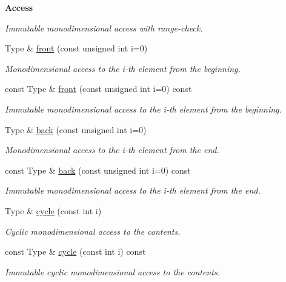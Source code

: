 \begin{Indent}{\bf Access}
\begin{DoxyCompactItemize}
\begin{DoxyCompactList}\small\item\em Immutable monodimensional access with range-\/check. \end{DoxyCompactList}\item 
Type \& \hyperlink{classmagrathea_1_1StaticVectorizer_a860d99a0104280c072d7b7dbf8d87c27}{front} (const unsigned int i=0)
\begin{DoxyCompactList}\small\item\em Monodimensional access to the i-\/th element from the beginning. \end{DoxyCompactList}\item 
const Type \& \hyperlink{classmagrathea_1_1StaticVectorizer_afedeae49461374b9a8cd0fe6615b75bf}{front} (const unsigned int i=0) const 
\begin{DoxyCompactList}\small\item\em Immutable monodimensional access to the i-\/th element from the beginning. \end{DoxyCompactList}\item 
Type \& \hyperlink{classmagrathea_1_1StaticVectorizer_ae1d5d72bbbf0c8b41de7ff463eb72606}{back} (const unsigned int i=0)
\begin{DoxyCompactList}\small\item\em Monodimensional access to the i-\/th element from the end. \end{DoxyCompactList}\item 
const Type \& \hyperlink{classmagrathea_1_1StaticVectorizer_a3efc84b306bb29fdcc1c13b0bb46e603}{back} (const unsigned int i=0) const 
\begin{DoxyCompactList}\small\item\em Immutable monodimensional access to the i-\/th element from the end. \end{DoxyCompactList}\item 
Type \& \hyperlink{classmagrathea_1_1StaticVectorizer_a3cc47c0b28180723f001d6c2dce89a78}{cycle} (const int i)
\begin{DoxyCompactList}\small\item\em Cyclic monodimensional access to the contents. \end{DoxyCompactList}\item 
const Type \& \hyperlink{classmagrathea_1_1StaticVectorizer_a42143d4ae441b0a39d6632a40c34dcbc}{cycle} (const int i) const 
\begin{DoxyCompactList}\small\item\em Immutable cyclic monodimensional access to the contents. \end{DoxyCompactList}\end{DoxyCompactItemize}
\end{Indent}
